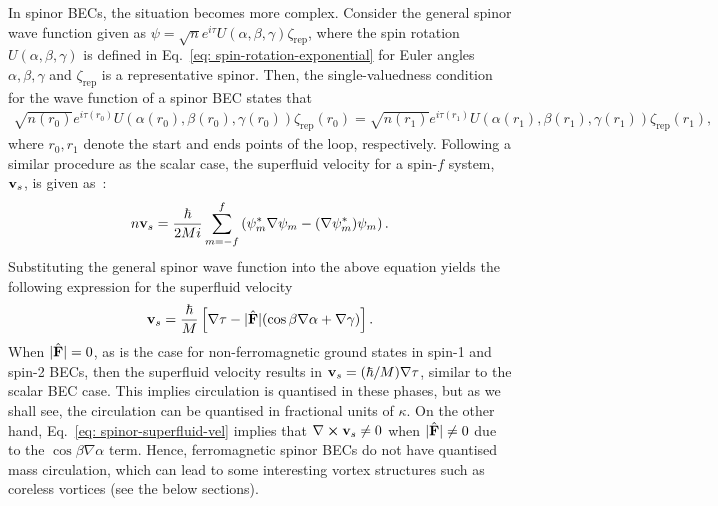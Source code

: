 In spinor BECs, the situation becomes more complex.
Consider the general spinor wave function given as \(\psi =
\sqrt{n}e^{i\tau}U(\alpha, \beta, \gamma)\zeta_\text{rep}\), where the spin
rotation \(U(\alpha, \beta, \gamma)\) is defined in
Eq.~\eqref{eq: spin-rotation-exponential} for Euler angles
\(\alpha, \beta, \gamma \) and \(\zeta_\text{rep}\) is a representative spinor.
Then, the single-valuedness condition for the wave function of a spinor BEC
states that~\cite{Kawaguchi2012}
\begin{align}
    \sqrt{n(r_0)}e^{i\tau(r_0)}U(\alpha(r_0), \beta(r_0), \gamma(r_0))
    \zeta_\text{rep}(r_0) = \sqrt{n(r_1)}e^{i\tau(r_1)}
    U(\alpha(r_1), \beta(r_1), \gamma(r_1)) \zeta_\text{rep}(r_1),
\end{align}
where \(r_0, r_1\) denote the start and ends points of the loop, respectively.
Following a similar procedure as the scalar case, the superfluid velocity for a
spin-\(f\) system, \(\vb{v}_s\), is given as~\cite{Kawaguchi2012}:
\begin{align}\label{eq: spinor-mass-current}
    n\vb{v}_s = \frac{\hbar}{2Mi}\sum_{m=-f}^f\left(\psi^*_m\nabla\psi_m
    - {(\nabla \psi_m^*)}\psi_m\right).
\end{align}
Substituting the general spinor wave function into the above equation yields
the following expression for the superfluid velocity
\begin{align}\label{eq: spinor-superfluid-vel}
    \vb{v}_s = \frac{\hbar}{M}\left[\nabla\tau - |\hat{\vb{F}}| (
        \cos\beta\nabla\alpha + \nabla\gamma)\right].
\end{align}
When \(|\hat{\vb{F}}| = 0\), as is the case for non-ferromagnetic ground states
in spin-1 and spin-2 BECs, then the superfluid velocity results in
\(\vb{v}_s=(\hbar/M)\nabla\tau \), similar to the scalar BEC case.
This implies circulation is quantised in these phases, but as we shall see, the
circulation can be quantised in fractional units of \(\kappa \).
On the other hand, Eq.~\eqref{eq: spinor-superfluid-vel} implies that
\(\nabla \cross \vb{v}_s \neq 0\) when \(|\hat{\vb{F}}| \neq 0\) due to the
\(\cos\beta\nabla\alpha \) term.
Hence, ferromagnetic spinor BECs do not have quantised mass circulation, which
can lead to some interesting vortex structures such as coreless vortices
(see the below sections).

